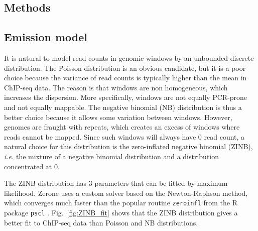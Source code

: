 \documentclass{bioinfo}
\begin{document}
\begin{methods}
\section{Methods}

\subsection{Emission model}
\label{sub:emissions}
It is natural to model read counts in genomic windows by an unbounded
discrete distribution. The Poisson distribution is an obvious candidate,
but it is a poor choice because the variance of read counts is typically
higher than the mean in ChIP-seq data. The reason is that windows are non
homogeneous, which increases the dispersion. More specifically, windows
are not equally PCR-prone and not equally mappable. The negative binomial
(NB) distribution is thus a better choice because it allows some variation
between windows. However, genomes are fraught with repeats, which creates
an excess of windows where reads cannot be mapped. Since such windows
will always have 0 read count, a natural choice for this distribution is
the zero-inflated negative binomial (ZINB), \textit{i.e.} the mixture of
a negative binomial distribution and a distribution concentrated at 0.

The ZINB distribution has 3 parameters that can be fitted by maximum
likelihood. Zerone uses a custom solver based on the Newton-Raphson
method, which converges much faster than the popular routine
\texttt{zeroinfl} \citep{psclb} from the R \citep{R} package \texttt{pscl}
\citep{pscla}.
Fig.~\ref{fig:ZINB_fit} shows that the ZINB distribution gives a better
fit to ChIP-seq data than Poisson and NB distributions.


\end{methods}
\end{document}
